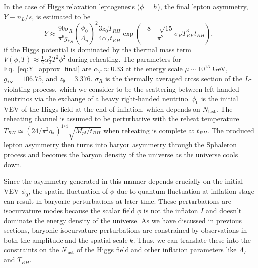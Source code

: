 \documentclass[11pt,a4paper]{article}
\begin{document}
In the case of Higgs relaxation leptogenesis ($\phi=h$), the final lepton asymmetry, $Y\equiv n_{L}/s$, is estimated to be \cite{Kusenko:2017kdr} 
\begin{equation}
Y\approx\dfrac{90\sigma_{R}}{\pi^{6}g_{*S}}\left(\dfrac{\phi_{0}}{\Lambda_{n}}\right)^{2}\dfrac{3z_{0}T_{RH}}{4\alpha_{T}t_{RH}}\exp\left(-\dfrac{8+\sqrt{15}}{\pi^{2}}\sigma_{R}T_{RH}^{3}t_{RH}\right),\label{eq:Y_approx_final}
\end{equation}
if the Higgs potential is dominated by the thermal mass term $V\left(\phi,T\right)\approx\frac{1}{2}\alpha_{T}^{2}T^{2}\phi^{2}$ during reheating. The parameters for Eq.~\eqref{eq:Y_approx_final} are $\alpha_{T}\approx0.33$ at the energy scale $\mu\sim10^{13}$ GeV, $g_{*S}=106.75$, and $z_{0}=3.376$. $\sigma_{R}$ is the thermally averaged cross section of the $L$-violating process, which we consider to be the scattering between left-handed neutrinos via the exchange of a heavy right-handed neutrino. $\phi_{0}$ is the initial VEV of the Higgs field at the end of inflation, which depends on $N_{\mathrm{last}}$. The reheating channel is assumed to be perturbative with the reheat temperature $T_{RH}\simeq\left(24/\pi^{2}g_{*}\right)^{1/4}\sqrt{M_{pl}/t_{RH}}$ when reheating is complete at $t_{RH}$. The produced lepton asymmetry then turns into baryon asymmetry through the Sphaleron process and becomes the baryon density of the universe as the universe cools down.

Since the asymmetry generated in this manner depends crucially on the initial VEV $\phi_{0}$, the spatial fluctuation of $\phi$ due to quantum fluctuation at inflation stage can result in baryonic perturbations at later time. These perturbations are isocurvature modes because the scalar field $\phi$ is not the inflaton $I$ and doesn't dominate the energy density of the universe. As we have discussed in previous sections, baryonic isocurvature perturbations are constrained by observations in both the amplitude and the spatial scale $k$. Thus, we can translate these into the constraints on the $N_{\mathrm{last}}$ of the Higgs field and other inflation parameters like $\Lambda_{I}$ and $T_{RH}$.
\end{document}
